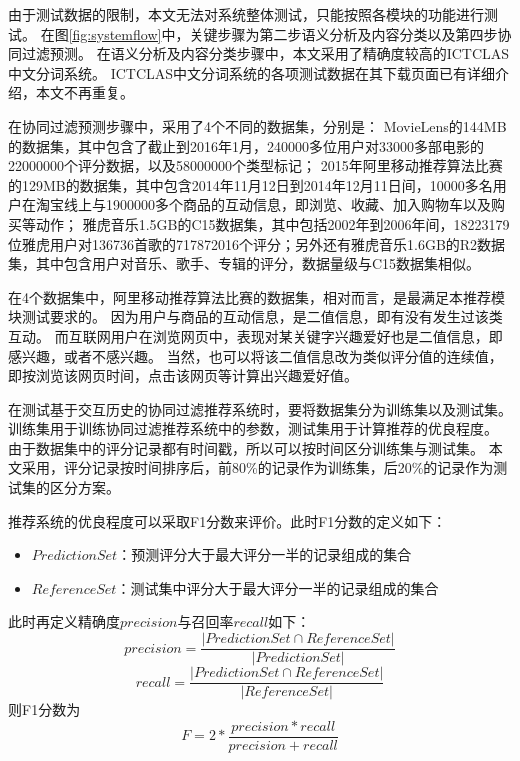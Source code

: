 由于测试数据的限制，本文无法对系统整体测试，只能按照各模块的功能进行测试。
在图\ref{fig:systemflow}中，关键步骤为第二步语义分析及内容分类以及第四步协同过滤预测。
在语义分析及内容分类步骤中，本文采用了精确度较高的ICTCLAS中文分词系统\supercite{Zhang2003CLA}。
ICTCLAS中文分词系统的各项测试数据在其下载页面已有详细介绍，本文不再重复。

在协同过滤预测步骤中，采用了4个不同的数据集，分别是：
MovieLens的144MB的数据集，其中包含了截止到2016年1月，240000多位用户对33000多部电影的22000000个评分数据，以及58000000个类型标记；
2015年阿里移动推荐算法比赛的129MB的数据集，其中包含2014年11月12日到2014年12月11日间，10000多名用户在淘宝线上与1900000多个商品的互动信息，即浏览、收藏、加入购物车以及购买等动作；
雅虎音乐1.5GB的C15数据集，其中包括2002年到2006年间，18223179位雅虎用户对136736首歌的717872016个评分；另外还有雅虎音乐1.6GB的R2数据集，其中包含用户对音乐、歌手、专辑的评分，数据量级与C15数据集相似。

在4个数据集中，阿里移动推荐算法比赛的数据集，相对而言，是最满足本推荐模块测试要求的。
因为用户与商品的互动信息，是二值信息，即有没有发生过该类互动。
而互联网用户在浏览网页中，表现对某关键字兴趣爱好也是二值信息，即感兴趣，或者不感兴趣。
当然，也可以将该二值信息改为类似评分值的连续值，即按浏览该网页时间，点击该网页等计算出兴趣爱好值。

在测试基于交互历史的协同过滤推荐系统时，要将数据集分为训练集以及测试集。
训练集用于训练协同过滤推荐系统中的参数，测试集用于计算推荐的优良程度。
由于数据集中的评分记录都有时间戳，所以可以按时间区分训练集与测试集。
本文采用，评分记录按时间排序后，前80\%的记录作为训练集，后20\%的记录作为测试集的区分方案。

推荐系统的优良程度可以采取F1分数来评价。此时F1分数的定义如下：
\begin{center}
\begin{itemize}
	\item $PredictionSet$：预测评分大于最大评分一半的记录组成的集合
	\item $ReferenceSet$：测试集中评分大于最大评分一半的记录组成的集合
\end{itemize}
\end{center}
此时再定义精确度$precision$与召回率$recall$如下：
\begin{equation}
precision= \frac{|PredictionSet\cap ReferenceSet|}{|PredictionSet|}
\end{equation}
\begin{equation}
recall= \frac{|PredictionSet\cap ReferenceSet|}{|ReferenceSet|}
\end{equation}
则F1分数为
\begin{equation}
F= 2* \frac{precision*recall}{precision+recall}
\end{equation}

